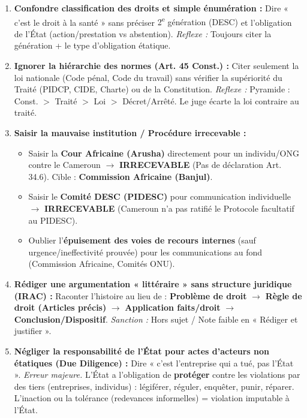\documentclass[11pt]{article}
\newcommand{\cle}[1]{{\popxbold\color{popdark}#1}}
\begin{document}
\begin{attention}
    \begin{enumerate}
        \item \textbf{Confondre classification des droits et simple énumération :} Dire « c'est le droit à la santé » sans préciser \cle{2\textsuperscript{e} génération (DESC)} et l'\cle{obligation de l'État (action/prestation vs abstention)}. \emph{Reflexe :} Toujours citer la génération + le type d'obligation étatique.
        \item \textbf{Ignorer la hiérarchie des normes (Art. 45 Const.) :} Citer seulement la loi nationale (Code pénal, Code du travail) sans vérifier la supériorité du Traité (PIDCP, CIDE, Charte) ou de la Constitution. \emph{Reflexe :} Pyramide : Const. $>$ Traité $>$ Loi $>$ Décret/Arrêté. Le juge écarte la loi contraire au traité.
        \item \textbf{Saisir la mauvaise institution / Procédure irrecevable :}
            \begin{itemize}
                \item Saisir la \textbf{Cour Africaine (Arusha)} directement pour un individu/ONG contre le Cameroun $\rightarrow$ \textbf{IRRECEVABLE} (Pas de déclaration Art. 34.6). Cible : \textbf{Commission Africaine (Banjul)}.
                \item Saisir le \textbf{Comité DESC (PIDESC)} pour communication individuelle $\rightarrow$ \textbf{IRRECEVABLE} (Cameroun n'a pas ratifié le Protocole facultatif au PIDESC).
                \item Oublier l'\textbf{épuisement des voies de recours internes} (sauf urgence/ineffectivité prouvée) pour les communications au fond (Commission Africaine, Comités ONU).
            \end{itemize}
        \item \textbf{Rédiger une argumentation « littéraire » sans structure juridique (IRAC) :} Raconter l'histoire au lieu de : \textbf{Problème de droit} $\rightarrow$ \textbf{Règle de droit (Articles précis)} $\rightarrow$ \textbf{Application faits/droit} $\rightarrow$ \textbf{Conclusion/Dispositif}. \emph{Sanction :} Hors sujet / Note faible en « Rédiger et justifier ».
        \item \textbf{Négliger la responsabilité de l'État pour actes d'acteurs non étatiques (Due Diligence) :} Dire « c'est l'entreprise qui a tué, pas l'État ». \emph{Erreur majeure.} L'État a l'obligation de \textbf{protéger} contre les violations par des tiers (entreprises, individus) : légiférer, réguler, enquêter, punir, réparer. L'inaction ou la tolérance (redevances informelles) = violation imputable à l'État.
    \end{enumerate}
\end{attention}
\end{document}
